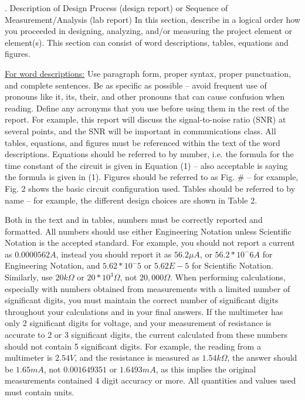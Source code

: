 \documentclass[11pt]{ECEtemp}
\begin{document}
. Description of Design Process (design report) or Sequence of Measurement/Analysis (lab report)
In this section, describe in a logical order how you proceeded in designing, analyzing, and/or measuring the project element or element(s). This section can consist of word descriptions, tables, equations and figures. 

\underline{For word descriptions:}  Use paragraph form, proper syntax, proper punctuation, and complete sentences.  Be as specific as possible – avoid frequent use of pronouns like it, its, their, and other pronouns that can cause confusion when reading. Define any acronyms that you use before using them in the rest of the report. For example, this report will discuss the signal-to-noise ratio (SNR) at several points, and the SNR will be important in communications class. All tables, equations, and figures must be referenced within the text of the word descriptions.  Equations should be referred to by number, i.e. the formula for the time constant of the circuit is given in Equation (1) – also acceptable is saying the formula is given in (1). Figures should be referred to as Fig. \# -- for example, Fig. 2 shows the basic circuit configuration used. Tables should be referred to by name – for example, the different design choices are shown in Table 2. 

Both in the text and in tables, numbers must be correctly reported and formatted. 
All numbers should use either Engineering Notation unless Scientific Notation is the accepted standard.  
For example, you should not report a current as $0.0000562 A$, instead you should report it as $56.2 \mu A$, or $56.2*10^-6 A$ for Engineering Notation, and $5.62*10^-5$ or $5.62E-5$ for Scientific Notation. 
Similarly, use $20 k \Omega$ or $20*10^3 \Omega$, not $20,000 \Omega$. When performing calculations, especially with numbers obtained from measurements with a limited number of significant digits, you must maintain the correct number of significant digits throughout your calculations and in your final answers.  
If the multimeter has only 2 significant digits for voltage, and your measurement of resistance is accurate to 2 or 3 significant digits, the current calculated from these numbers should not contain 5 significant digits.  
For example, the reading from a multimeter is $2.54 V$, and the resistance is measured as $1.54 k \Omega$, the answer should be $1.65 mA$, not $0.001649351$ or $1.6493 mA$, as this implies the original measurements contained 4 digit accuracy or more. 
All quantities and values used must contain units.
\end{document}
